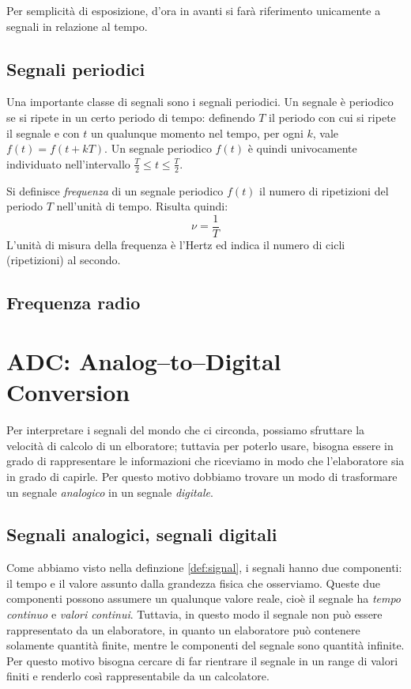 Per semplicit\`a di esposizione, d'ora in avanti si far\`a riferimento
unicamente a segnali in relazione al tempo.
\subsection{Segnali periodici}
Una importante classe di segnali sono i segnali periodici. Un segnale \`e
periodico se si ripete in un certo periodo di tempo: definendo $T$ il periodo con
cui si ripete il segnale e con $t$ un qualunque momento nel tempo, per ogni $k$,
vale $f(t) = f(t + kT)$. Un segnale periodico $f(t)$ \`e quindi univocamente
individuato nell'intervallo $\frac{T}{2} \le t \le \frac{T}{2}$.

Si definisce  \emph{frequenza} di un segnale periodico $f(t)$ il numero di
ripetizioni del periodo $T$ nell'unit\`a di tempo. Risulta quindi:
\[
\nu = \frac{1}{T}
\]
L'unit\`a di misura della frequenza \`e l'Hertz ed indica il numero di cicli
(ripetizioni) al secondo.
\subsection{Frequenza radio}
\section{ADC: Analog--to--Digital Conversion}
Per interpretare i segnali del mondo che ci circonda, possiamo sfruttare la
velocit\`a di calcolo di un elboratore; tuttavia per poterlo usare, bisogna
essere in grado di rappresentare le informazioni che riceviamo in modo che
l'elaboratore sia in grado di capirle. Per questo motivo dobbiamo trovare un
modo di trasformare un segnale \emph{analogico} in un segnale \emph{digitale}.
\subsection{Segnali analogici, segnali digitali}
Come abbiamo visto nella definzione \ref{def:signal}, i segnali hanno due
componenti: il tempo e il valore assunto dalla grandezza fisica che osserviamo.
Queste due componenti possono assumere un qualunque valore reale, cio\`e il
segnale ha \emph{tempo continuo} e \emph{valori continui}. Tuttavia, in questo
modo il segnale non pu\`o essere rappresentato da un elaboratore, in quanto un
elaboratore pu\`o contenere solamente quantit\`a finite, mentre le componenti
del segnale sono quantit\`a infinite. Per questo motivo bisogna cercare di far
rientrare il segnale in un range di valori finiti e renderlo cos\`i
rappresentabile da un calcolatore.

